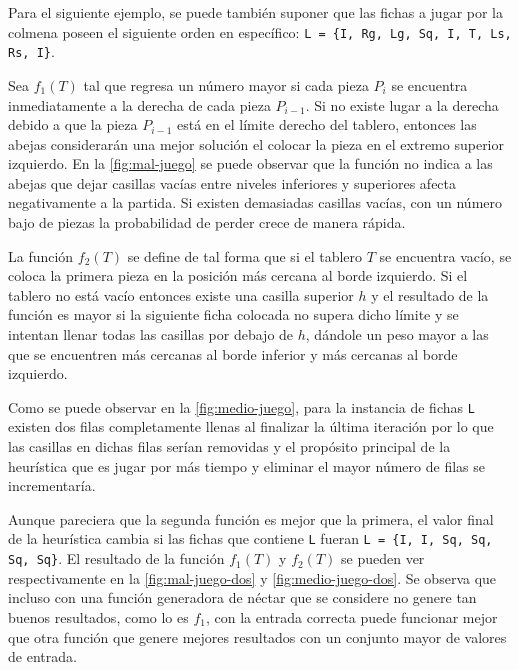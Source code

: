 Para el siguiente ejemplo, se puede también suponer que las fichas a jugar por la colmena 
poseen el siguiente orden en específico: \texttt{L = \{I, Rg, Lg, Sq, 
I, T, Ls, Rs, I\}}.

Sea $f_{1}(T)$ tal que regresa un número mayor si cada pieza $P_{i}$ se 
encuentra inmediatamente a la derecha de cada pieza $P_{i-1}$. Si no existe 
lugar a la derecha debido a que la pieza $P_{i-1}$ está en el límite derecho del tablero, 
entonces las abejas considerarán una mejor solución el colocar la pieza  
en el extremo superior izquierdo. En la \cref{fig:mal-juego} se puede observar que 
la función no indica a las abejas que dejar casillas vacías entre niveles inferiores 
y superiores afecta negativamente a la partida. Si existen demasiadas casillas vacías, 
con un número bajo de piezas la probabilidad de perder crece de manera rápida. 



La función $f_{2}(T)$ se define de tal forma que si el tablero $T$ se encuentra 
vacío, se coloca la primera pieza en la posición más cercana al borde izquierdo. 
Si el tablero no está vacío entonces existe una casilla superior $h$ y el resultado 
de la función es mayor si la siguiente ficha colocada no supera dicho límite y 
se intentan llenar todas las casillas por debajo de $h$, dándole un peso mayor 
a las que se encuentren más cercanas al borde inferior y más cercanas al borde izquierdo.



Como se puede observar en la \cref{fig:medio-juego}, para la instancia de fichas 
\texttt{L} existen dos filas completamente llenas al finalizar la última 
iteración por lo que las casillas en dichas filas serían removidas y el 
propósito principal de la heurística que es jugar por más tiempo y eliminar el 
mayor número de filas se incrementaría. 

Aunque pareciera que la segunda función es mejor que la primera, el valor final 
de la heurística cambia si las fichas que contiene \texttt{L} fueran  
\texttt{L = \{I, I, Sq, Sq, Sq, Sq\}}. El resultado de la función $f_{1}(T)$ y 
$f_{2}(T)$ se pueden ver respectivamente en la \cref{fig:mal-juego-dos} 
y \cref{fig:medio-juego-dos}. Se observa que incluso con una función 
generadora de néctar que se considere no genere tan buenos resultados, como lo 
es $f_{1}$, con la entrada correcta puede funcionar mejor que otra función que genere 
mejores resultados con un conjunto mayor de valores de entrada.

